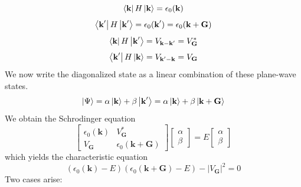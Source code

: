 \documentclass[10pt]{article}
\begin{document}
$$
\bra{\textbf{k}}H\ket{\textbf{k}} = \epsilon_{0}(\textbf{k})
$$
$$\bra{\textbf{k}'}H\ket{\textbf{k}'} = \epsilon_{0}(\textbf{k}') = \epsilon_{0}(\textbf{k} + \textbf{G})$$
$$ \bra{\textbf{k}}H\ket{\textbf{k}'} = V_{\textbf{k} - \textbf{k}'} = V_{\textbf{G}}^{*}$$
$$\bra{\textbf{k}'}H\ket{\textbf{k}} = V_{\textbf{k}' - \textbf{k}} = V_{\textbf{G}}$$
We now write the diagonalized state as a linear combination of these plane-wave states.
$$
\ket{\Psi} = \alpha\ket{\textbf{k}} + \beta\ket{\textbf{k}'} = \alpha\ket{\textbf{k}} + \beta\ket{\textbf{k} + \textbf{G}}
$$
We obtain the Schrodinger equation
$$
\begin{bmatrix}
  \epsilon_{0}(\textbf{k}) &  V_{\textbf{G}}^{*}\\
   V_{\textbf{G}}& \epsilon_{0}(\textbf{k} + \textbf{G})
\end{bmatrix}
\begin{bmatrix}
  \alpha \\
  \beta
\end{bmatrix}
 = E \begin{bmatrix} \alpha \\ \beta\end{bmatrix}
$$
which yields the characteristic equation
$$\left ( \epsilon_{0}(\textbf{k}) - E \right)\left (\epsilon_{0}(\textbf{k} + \textbf{G}) - E \right) - |V_{\textbf{G}}|^{2} = 0$$
Two cases arise:
\end{document}
